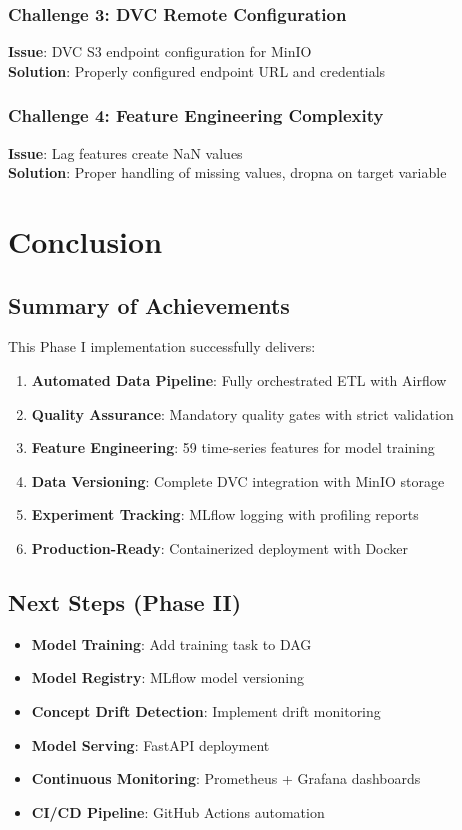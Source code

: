 \documentclass[12pt,a4paper]{article}
\begin{document}
\subsubsection{Challenge 3: DVC Remote Configuration}
\textbf{Issue}: DVC S3 endpoint configuration for MinIO \\
\textbf{Solution}: Properly configured endpoint URL and credentials

\subsubsection{Challenge 4: Feature Engineering Complexity}
\textbf{Issue}: Lag features create NaN values \\
\textbf{Solution}: Proper handling of missing values, dropna on target variable

\section{Conclusion}

\subsection{Summary of Achievements}

This Phase I implementation successfully delivers:

\begin{enumerate}
    \item \textbf{Automated Data Pipeline}: Fully orchestrated ETL with Airflow
    \item \textbf{Quality Assurance}: Mandatory quality gates with strict validation
    \item \textbf{Feature Engineering}: 59 time-series features for model training
    \item \textbf{Data Versioning}: Complete DVC integration with MinIO storage
    \item \textbf{Experiment Tracking}: MLflow logging with profiling reports
    \item \textbf{Production-Ready}: Containerized deployment with Docker
\end{enumerate}

\subsection{Next Steps (Phase II)}

\begin{itemize}
    \item \textbf{Model Training}: Add training task to DAG
    \item \textbf{Model Registry}: MLflow model versioning
    \item \textbf{Concept Drift Detection}: Implement drift monitoring
    \item \textbf{Model Serving}: FastAPI deployment
    \item \textbf{Continuous Monitoring}: Prometheus + Grafana dashboards
    \item \textbf{CI/CD Pipeline}: GitHub Actions automation
\end{itemize}
\end{document}
